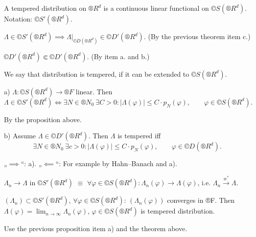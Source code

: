 \documentclass[12pt]{article}					%
\begin{document}
\begin{definice}
	A tempered distribution on $®R^d$ is a continuous linear functional on $©S(®R^d)$. Notation: $©S'(®R^d)$.
\end{definice}

\begin{poznamka}
	$Λ \in ©S'(®R^d) \implies Λ|_{©D(®R^d)} \in ©D'(®R^d)$. (By the previous theorem item c.)

	$©D'(®R^d) \Subset ©D'(®R^d)$. (By item a. and b.)

	We say that distribution is tempered, if it can be extended to $©S(®R^d)$.
\end{poznamka}

\begin{tvrzeni}
	a) $Λ: ©S(®R^d) \rightarrow ®F$ linear. Then
	$$ Λ \in ©S'(®R^d) \Leftrightarrow \exists N \in ®N_0\ \exists C > 0: |Λ(φ)| ≤ C·p_N(φ), \qquad φ \in ©S(®R^d). $$

	\begin{dukazin}
		By the proposition above.
	\end{dukazin}

	b) Assume $Λ \in ©D'(®R^d)$. Then $Λ$ is tempered iff
	$$ \exists N \in ®N_0\ \exists c > 0: |Λ(φ)| ≤ C·p_N(φ), \qquad φ \in ©D(®R^d). $$

	\begin{dukazin}
		„$\implies$“: a). „$\impliedby$“: For example by Hahn–Banach and a).
	\end{dukazin}
\end{tvrzeni}

\begin{definice}[Convergence in $©S'$]
	$Λ_n \rightarrow Λ$ in $©S'(®R^d)$ $≡$ $\forall φ \in ©S(®R^d): Λ_n(φ) \rightarrow Λ(φ)$, i.e. $Λ_n \overset{w^*}\rightarrow Λ$.
\end{definice}

\begin{veta}
	$(Λ_n) \subset ©S'(®R^d)$, $\forall φ \in ©S(®R^d)$: $(Λ_n(φ))$ converges in ®F. Then $Λ(φ) = \lim_{n \rightarrow ∞} Λ_n(φ)$, $φ \in ©S(®R^d)$ is tempered distribution.
	
	\begin{dukazin}
		Use the previous proposition item a) and the theorem above.
	\end{dukazin}
\end{veta}
\end{document}
